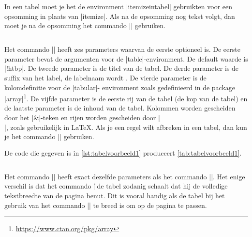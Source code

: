 \begin{llstShortInline}
	In een tabel moet je het de environment |itemizeintabel| gebruikten voor een opsomming in plaats van |itemize|.
	Als na de opsomming nog tekst volgt, dan moet je na de opsomming het commando |\vspace*{1.2\baselineskip}| gebruiken.
		
	\subsection{\texorpdfstring{\lcode{\\tabel}}{\textbackslash{}tabel}}
	Het commando |\tabel| heeft zes parameters waarvan de eerste optioneel is.
	De eerste parameter bevat de  argumenten voor de |table|-environment.
	De default waarde is |!htbp|.
	De tweede parameter is de titel van de tabel.
	De derde parameter is de suffix van het label, de labelnaam wordt {\lstllabel{}}.
	De vierde parameter is de kolomdefinitie voor de |tabular|- environment zoals gedefinieerd in de package |array|\footnote{\url{https://www.ctan.org/pkg/array}}.
	De vijfde parameter is de eerste rij van de tabel (de kop van de tabel) en de laatste parameter is de inhoud van de tabel.
	Kolommen worden gescheiden door het |&|-teken en rijen worden gescheiden door |\\|, zoals gebruikelijk in \LaTeX{}.
	Als je een regel wilt afbreken in een tabel, dan kun je het commando |\newline| gebruiken.
	
	De code die gegeven is in \cref{lst:tabelvoorbeeld1} produceert \cref{tab:tabelvoorbeeld1}.
	
{}%
		
	
	\subsection{\texorpdfstring{\lcode{\\tabelmaxpaginabreedgeschaald}}{\textbackslash{}tabelmaxpaginabreedgeschaald}}
	Het commando |\tabelmaxpaginabreedgeschaald| heeft exact dezelfde parameters als het commando |\tabel|.
	Het enige verschil is dat het commando |\|{\lstlcs{}} de tabel zodanig schaalt dat hij de volledige tekstbreedte van de pagina benut.
	Dit is vooral handig als de tabel bij het gebruik van het commando |\tabel| te breed is om op de pagina te passen.
	

\end{llstShortInline}
